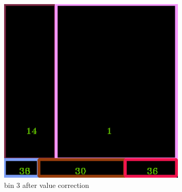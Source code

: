 \documentclass[11pt]{article}
\begin{document}
\begin{figure}
    \begin{minipage}[htb]{0.33\linewidth}
    \centering
    \includegraphics[width=0.8\textwidth]{FIGS/2/output3.png}
    \caption{bin 3 after value correction}
    \label{skyline}
    \end{minipage}
    \end{figure}
\end{document}
